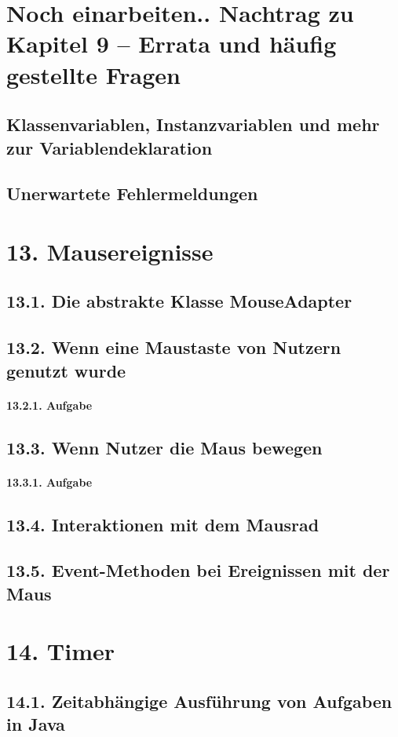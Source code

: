 \section{Noch einarbeiten.. Nachtrag zu Kapitel 9 – Errata und häufig gestellte Fragen}
\subsection{Klassenvariablen, Instanzvariablen und mehr zur Variablendeklaration}
\subsection{Unerwartete Fehlermeldungen}
\section{13.	Mausereignisse}
\subsection{13.1.	Die abstrakte Klasse MouseAdapter}
\subsection{13.2.	Wenn eine Maustaste von Nutzern genutzt wurde}
\paragraph{13.2.1.	Aufgabe}
\subsection{13.3.	Wenn Nutzer die Maus bewegen}
\paragraph{13.3.1.	Aufgabe}
\subsection{13.4.	Interaktionen mit dem Mausrad}
\subsection{13.5.	Event-Methoden bei Ereignissen mit der Maus}
\section{14.	Timer}
\subsection{14.1.	Zeitabhängige Ausführung von Aufgaben in Java}

